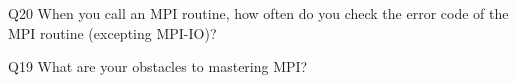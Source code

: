 \begin{description}%
\item{Q20} When you call an MPI routine, how often do you check the error code of the MPI routine  (excepting MPI-IO)?%
\item{Q19} What are your obstacles to mastering MPI?%
\end{description}%
